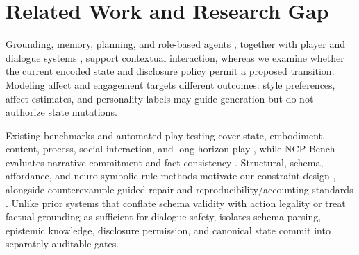 \section{Related Work and Research Gap}
Grounding, memory, planning, and role-based agents \cite{S03_weir2024ontologically,S20_ashby2023personalized,S07_park2023generative,S08_shao2023character}, together with player and dialogue systems \cite{S21_akoury2023player,S22_hochreiter2026beyond,S23_yin2026contextualized,S02_figueiredo2025scaffolded}, support contextual interaction, whereas we examine whether the current encoded state and disclosure policy permit a proposed transition. Modeling affect and engagement \cite{S24_yannakakis2011experiencedriven,S25_melhart2020engagement,S26_wang2026engagement} targets different outcomes: style preferences, affect estimates, and personality labels may guide generation but do not authorize state mutations.

Existing benchmarks and automated play-testing cover state, embodiment, content, process, social interaction, and long-horizon play \cite{S11_cote2019textworld,S12_wang2022scienceworld,S13_fan2022minedojo,S14_perezliebana2019gvgai,S15_liu2024agentbench,S16_ma2024agentboard,S17_zhou2024sotopia,S18_paglieri2025balrog,S19_lepelletier2022playtesting}, while NCP-Bench evaluates narrative commitment and fact consistency \cite{S58_ma2026ncpbench}. Structural, schema, affordance, and neuro-symbolic rule methods motivate our constraint design \cite{S09_geng2023grammar,S10_beurerkellner2023prompting,S36_scholak2021picard,S50_kambhampati2024llmmodulo,S51_ichter2023saycan,S52_wang2025agentspec,S53_li2025settingdc,S54_zhou2025story2game,S42_buongiorno2024pangea,alshiekh2018shield,rebedea2023nemo}, alongside counterexample-guided repair \cite{S45_madaan2023selfrefine,S48_shinn2023reflexion,S46_chen2023selfdebug,S47_solarlezama2006sketching} and reproducibility/accounting standards \cite{S31_agarwal2021precipice,S33_pineau2021reproducibility,S56_feng2025agentrr,S59_sun2025bdc,gebru2021datasheets,akhtar2024croissant}. Unlike prior systems that conflate schema validity with action legality or treat factual grounding as sufficient for dialogue safety, \system{} isolates schema parsing, epistemic knowledge, disclosure permission, and canonical state commit into separately auditable gates.
